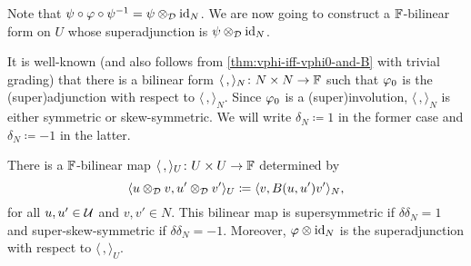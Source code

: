 Note that $\psi \circ \varphi \circ \psi^{-1} = \psi\otimes_{\mathcal{D}} \operatorname{id}_N$. 
We are now going to construct a $\mathbb{F}$-bilinear form on $U$ whose superadjunction is $\psi\otimes_{\mathcal{D}} \operatorname{id}_N$. 

It is well-known (and also follows from \cref{thm:vphi-iff-vphi0-and-B} with trivial grading) that there is a bilinear form $\langle \, , \rangle_N \colon N\times N \to \mathbb{F}$ such that $\varphi_0$ is the (super)adjunction with respect to $\langle \, , \rangle_N$. 
Since $\varphi_0$ is a (super)involution, $\langle \, , \rangle_N$ is either symmetric or skew-symmetric. 
We will write $\delta_N \coloneqq 1$ in the former case and $\delta_N \coloneqq -1$ in the latter. 

\begin{lemma}\label{lemma:the-same-vphi}
    There is a $\mathbb{F}$-bilinear map $\langle \, , \rangle_U \colon U\times U \to \mathbb{F}$ determined by 
    \[
        \langle u \otimes_{\mathcal{D}} v , u' \otimes_{\mathcal{D}} v' \rangle_U \coloneqq \langle v , B(u, u') v' \rangle_N,
    \]
    for all $u, u'\in \mathcal U$ and $v, v' \in N$. 
    This bilinear map is supersymmetric if $\delta \delta_N =1$ and super-skew-symmetric if $\delta \delta_N = -1$. 
    Moreover, $\varphi \otimes \operatorname{id}_N$ is the superadjunction with respect to $\langle \, , \rangle_U$. 
\end{lemma}

